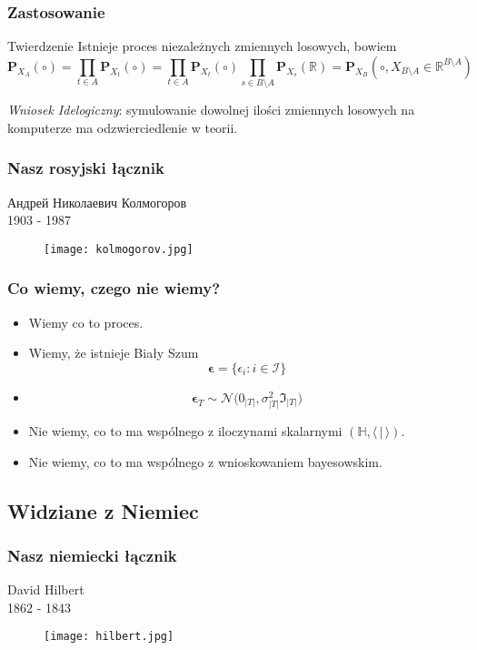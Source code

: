 \documentclass[draft, xetex]{beamer}
\newcommand{\eps}{\mathbf{\epsilon}}
\begin{document}
\begin{frame}
	\frametitle{Zastosowanie}			
	
	\begin{block}{Twierdzenie}
		Istnieje proces niezależnych zmiennych losowych, bowiem
		$$\mathbf{P}_{X_A}(\circ) = \prod_{t \in A} \mathbf{P}_{X_t} (\circ) = \prod_{t \in A} \mathbf{P}_{X_t} (\circ) \prod_{s \in B \setminus A} \mathbf{P}_{X_s} (\mathbb{R}) = \mathbf{P}_{X_B} (\circ, X_{B\setminus A} \in \mathbb{R}^{B \setminus A})$$
	\end{block}
	
	\emph{Wniosek Idelogiczny}: symulowanie dowolnej ilości zmiennych losowych na komputerze ma odzwierciedlenie w teorii.
\end{frame}

\begin{frame}
	\frametitle{Nasz rosyjski łącznik}
	
	\begin{center}
		Андрей Николаевич Колмогоров \\
		1903 - 1987
	\end{center}
	\begin{figure}
		\texttt{[image: kolmogorov.jpg]}
	\end{figure}
\end{frame}

\begin{frame}
	\frametitle{Co wiemy, czego nie wiemy?}
	
	\begin{itemize}
		\item Wiemy co to proces.
		\item Wiemy, że istnieje Biały Szum $$\eps = \{\epsilon_i : i \in \mathcal{I} \}$$
		\item $$\eps_T \sim \mathcal{N}\Big( \mathfrak{0}_{|T|}, \sigma^2_{|T|}\mathfrak{I}_{|T|}\Big)$$
		\item Nie wiemy, co to ma wspólnego z iloczynami skalarnymi $(\mathbb{H}, \langle \, |\, \rangle)$.
		\item Nie wiemy, co to ma wspólnego z wnioskowaniem bayesowskim.
	\end{itemize}
\end{frame}

\subsection{Widziane z Niemiec}


\begin{frame}
	\frametitle{Nasz niemiecki łącznik}
	
	\begin{center}
		David Hilbert \\
		1862 - 1843
	\end{center}
	\begin{figure}
		\texttt{[image: hilbert.jpg]}
	\end{figure}
\end{frame}
\end{document}

